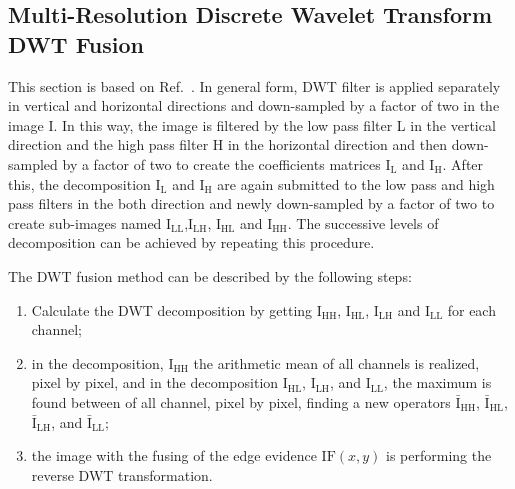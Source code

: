 \documentclass[journal]{IEEEtran}
\begin{document}
\subsection{Multi-Resolution Discrete Wavelet Transform DWT Fusion} 
This section is based on Ref.~\cite{n_r}. In general form, DWT filter is applied separately in vertical and horizontal directions and down-sampled by a factor of two in the image I. In this way, the image is filtered by the low pass filter L in the vertical direction and the high pass filter H in the horizontal direction and then down-sampled by a factor of two to create the coefficients matrices $\text{I}_\text{L}$ and $\text{I}_\text{H}$. After this, the decomposition $\text{I}_\text{L}$ and $\text{I}_\text{H}$ are again submitted to the low pass and high pass filters in the both direction and newly down-sampled by a factor of two to create sub-images named $\text{I}_\text{LL}$,$\text{I}_\text{LH}$, $\text{I}_\text{HL}$ and $\text{I}_\text{HH}$. The successive levels of decomposition can be achieved by repeating this procedure.

The DWT fusion method can be described by the following steps:
\begin{enumerate}
\item Calculate the DWT decomposition by getting $\text{I}_\text{HH}$, $\text{I}_\text{HL}$, $\text{I}_\text{LH}$ and $\text{I}_\text{LL}$ for each channel;
\item in the decomposition, $\text{I}_\text{HH}$ the arithmetic mean of all channels is realized, pixel by pixel, and in the decomposition $\text{I}_\text{HL}$, $\text{I}_\text{LH}$, and $\text{I}_\text{LL}$, the maximum is found between of all channel, pixel by pixel, finding a new operators $\bar{\text{I}}_\text{HH}$, $\bar{\text{I}}_\text{HL}$, $\bar{\text{I}}_\text{LH}$, and $\bar{\text{I}}_\text{LL}$;
\item the image with the fusing of the edge evidence $\text{IF}(x,y)$ is performing the reverse DWT transformation.  
\end{enumerate}
\end{document}
